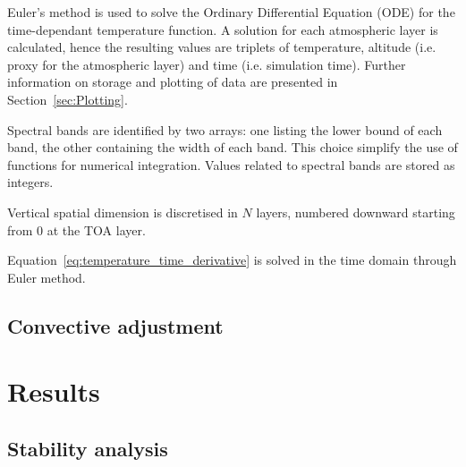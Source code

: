 \documentclass[a4paper,10pt,twocolumn,\classoptions]{article}
\begin{document}
Euler's method is used to solve the Ordinary Differential Equation (ODE) for the time-dependant temperature function.
A solution for each atmospheric layer is calculated, hence the resulting values are triplets of temperature, altitude (i.e. proxy for the atmospheric layer) and time (i.e. simulation time). Further information on storage and plotting of data are presented in Section~\ref{sec:Plotting}.

Spectral bands are identified by two arrays: one listing the lower bound of each band, the other containing the width of each band. This choice simplify the use of functions for numerical integration. Values related to spectral bands are stored as integers.

Vertical spatial dimension is discretised in $N$ layers, numbered downward starting from 0 at the TOA layer.

Equation~\eqref{eq:temperature_time_derivative} is solved in the time domain through Euler method. %




\subsection{Convective adjustment}
\label{sec:Convective adjustment}



\section{Results}



\subsection{Stability analysis}
\end{document}
